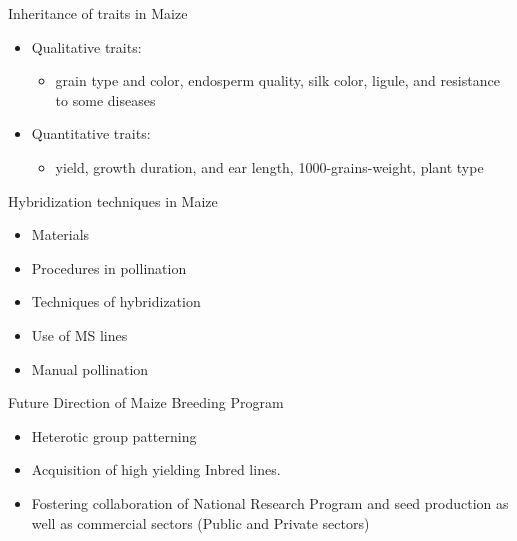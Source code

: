 \documentclass[11pt,dvipsnames,ignorenonframetext,aspectratio=169]{beamer}
\providecommand{\tightlist}{%
  \setlength{\itemsep}{0pt}\setlength{\parskip}{0pt}}
\begin{document}
\begin{frame}{Inheritance of traits in Maize}
\protect\hypertarget{inheritance-of-traits-in-maize}{}

\begin{itemize}
\tightlist
\item
  Qualitative traits:

  \begin{itemize}
  \tightlist
  \item
    grain type and color, endosperm quality, silk color, ligule, and
    resistance to some diseases
  \end{itemize}
\item
  Quantitative traits:

  \begin{itemize}
  \tightlist
  \item
    yield, growth duration, and ear length, 1000-grains-weight, plant
    type
  \end{itemize}
\end{itemize}

\end{frame}

\begin{frame}{Hybridization techniques in Maize}
\protect\hypertarget{hybridization-techniques-in-maize}{}

\begin{itemize}
\tightlist
\item
  Materials
\item
  Procedures in pollination
\item
  Techniques of hybridization
\item
  Use of MS lines
\item
  Manual pollination
\end{itemize}

\end{frame}

\begin{frame}{Future Direction of Maize Breeding Program}
\protect\hypertarget{future-direction-of-maize-breeding-program}{}

\begin{itemize}
\tightlist
\item
  Heterotic group patterning
\item
  Acquisition of high yielding Inbred lines.
\item
  Fostering collaboration of National Research Program and seed
  production as well as commercial sectors (Public and Private sectors)
\end{itemize}

\end{frame}
\end{document}
